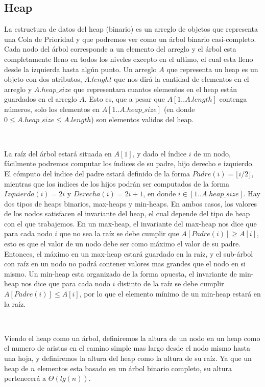 \subsection{Heap}

La estructura de datos del heap (binario) es un arreglo de objetos que representa una Cola de Prioridad y que podremos ver como un \'arbol binario casi-completo. Cada nodo del \'arbol corresponde a un elemento del arreglo y el \'arbol esta completamente lleno en todos los niveles excepto en el ultimo, el cual esta lleno desde la izquierda hasta alg\'un punto. Un arreglo $A$ que representa un heap es un objeto con dos atributos, $A.lenght$ que nos dir\'a la cantidad de elementos en el arreglo y $A.heap\_size$ que representara cuantos elementos en el heap est\'an guardados en el arreglo $A$. Esto es, que a pesar que $A[1..A.length]$ contenga n\'umeros, solo los elementos en $A[1..A.heap\_size]$ (en donde $0 \leq A.heap\_size \leq A.length$) son elementos validos del heap.

~

La ra\'iz del \'arbol estar\'a situada en $A[1]$, y dado el \'indice $i$ de un nodo, f\'acilmente podremos computar los \'indices de su padre, hijo derecho e izquierdo. El c\'omputo del \'indice del padre estar\'a definido de la forma $Padre(i) = \lfloor i/2 \rfloor$, mientras que los \'indices de los hijos podr\'an ser computados de la forma $Izquierda(i) = 2i$ y $Derecha(i) = 2i+1$, en donde $i \in [1..A.heap\_size]$. Hay dos tipos de heaps binarios, max-heaps y min-heaps. En ambos casos, los valores de los nodos satisfacen el invariante del heap, el cual depende del tipo de heap con el que trabajemos. En un max-heap, el invariante del max-heap nos dice que para cada nodo $i$ que no sea la ra\'iz se debe cumplir que $A[Padre(i)] \geq A[i]$, esto es que el valor de un nodo debe ser como m\'aximo el valor de su padre. Entonces, el m\'aximo en un max-heap estar\'a guardado en la ra\'iz, y el sub-\'arbol con ra\'iz en un nodo no podr\'a contener valores mas grandes que el nodo en si mismo. Un min-heap esta 
organizado de la forma opuesta, el invariante de min-heap nos dice que para cada nodo $i$ distinto de la ra\'iz se debe cumplir $A[Padre(i)] \leq A[i]$, por lo que el elemento m\'inimo de un min-heap estar\'a en la ra\'iz.

~

Viendo el heap como un \'arbol, definiremos la altura de un nodo en un heap como el numero de aristas en el camino simple mas largo desde el nodo mismo hasta una hoja, y definiremos la altura del heap como la altura de su ra\'iz. Ya que un heap de $n$ elementos esta basado en un \'arbol binario completo, su altura pertenecer\'a a $\Theta(lg(n))$.

